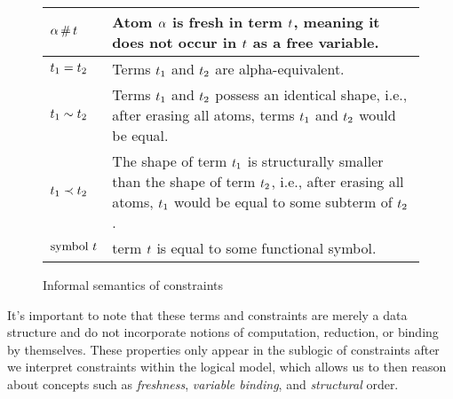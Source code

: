 \documentclass[english, mgr]{iithesis}
\renewcommand{\it}[1]{\textit{#1}}
\begin{document}
\begin{figure}[htbp]
  \centering
  \begin{tabularx}{\linewidth}{|l|X|}
    \hline
    $\alpha \,\#\, t$ & Atom $\alpha$ is fresh in term $t$, meaning it does not occur in $t$ as a free variable. \\
    \hline
    $t_1 = t_2$ & Terms $t_1$ and $t_2$ are alpha-equivalent. \\
    \hline
    $t_1 \sim t_2$ & Terms $t_1$ and $t_2$ possess an identical shape, i.e., after erasing all atoms, terms $t_1$ and $t_2$ would be equal. \\
    \hline
    $t_1 \prec t_2$ & The shape of term $t_1$ is structurally smaller than the shape of term $t_2$, i.e., after erasing all atoms, $t_1$ would be equal to some subterm of $t_2$. \\
    \hline
    $\text{symbol } t$ & term $t$ is equal to some functional symbol. \\
    \hline
  \end{tabularx}
  \caption{Informal semantics of constraints}
  \label{fig:informal-constraints-semantics}
\end{figure}

It's important to note that these terms and constraints are merely a data structure
and do not incorporate notions of computation, reduction, or binding by themselves.
These properties only appear in the sublogic of constraints after we interpret
constraints within the logical model, which allows us to then reason about
concepts such as \it{freshness}, \it{variable binding}, and \it{structural} order.
\end{document}
